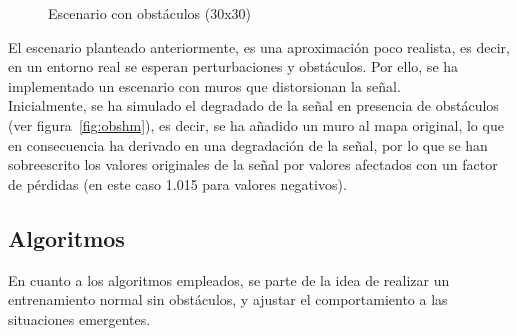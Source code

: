 \begin{figure} [tp]
	\centering
	\quad
	\caption{Escenario con obstáculos (30x30)}
	\label{fig:fig:obshm}
\end{figure}

El escenario planteado anteriormente, es una aproximación poco realista, es decir, en un entorno real se esperan perturbaciones y obstáculos. Por ello, se ha implementado un escenario con muros que distorsionan la señal.\\

Inicialmente, se ha simulado el degradado de la señal en presencia de obstáculos (ver figura~\ref{fig:obshm}), es decir, se ha añadido un muro al mapa original, lo que en consecuencia ha derivado en una degradación de la señal, por lo que se han sobreescrito los valores originales de la señal por valores afectados con un factor de pérdidas (en este caso 1.015 para valores negativos).\\

\subsection{Algoritmos}
\label{subsec:algoritmo_sfo}

En cuanto a los algoritmos empleados, se parte de la idea de realizar un entrenamiento normal sin obstáculos, y ajustar el comportamiento a las situaciones emergentes.\\

